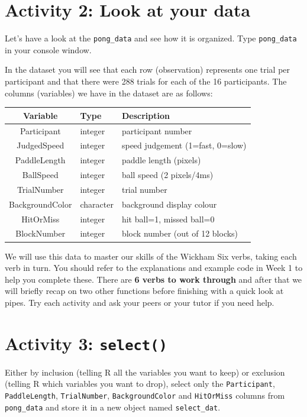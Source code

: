 \documentclass[]{book}
\begin{document}
\hypertarget{activity-2-look-at-your-data}{%
\section{Activity 2: Look at your data}\label{activity-2-look-at-your-data}}

Let's have a look at the \texttt{pong\_data} and see how it is organized. Type \texttt{pong\_data} in your console window.

In the dataset you will see that each row (observation) represents one trial per participant and that there were 288 trials for each of the 16 participants. The columns (variables) we have in the dataset are as follows:

\begin{longtable}[]{@{}cll@{}}
\toprule
Variable & Type & Description\tabularnewline
\midrule
\endhead
Participant & integer & participant number\tabularnewline
JudgedSpeed & integer & speed judgement (1=fast, 0=slow)\tabularnewline
PaddleLength & integer & paddle length (pixels)\tabularnewline
BallSpeed & integer & ball speed (2 pixels/4ms)\tabularnewline
TrialNumber & integer & trial number\tabularnewline
BackgroundColor & character & background display colour\tabularnewline
HitOrMiss & integer & hit ball=1, missed ball=0\tabularnewline
BlockNumber & integer & block number (out of 12 blocks)\tabularnewline
\bottomrule
\end{longtable}

We will use this data to master our skills of the Wickham Six verbs, taking each verb in turn. You should refer to the explanations and example code in Week 1 to help you complete these. There are \textbf{6 verbs to work through} and after that we will briefly recap on two other functions before finishing with a quick look at pipes. Try each activity and ask your peers or your tutor if you need help.

\hypertarget{activity-3-select}{%
\section{\texorpdfstring{Activity 3: \textbf{\texttt{select()}}}{Activity 3: select()}}\label{activity-3-select}}

Either by inclusion (telling R all the variables you want to keep) or exclusion (telling R which variables you want to drop), select only the \texttt{Participant}, \texttt{PaddleLength}, \texttt{TrialNumber}, \texttt{BackgroundColor} and \texttt{HitOrMiss} columns from \texttt{pong\_data} and store it in a new object named \texttt{select\_dat}.
\end{document}

